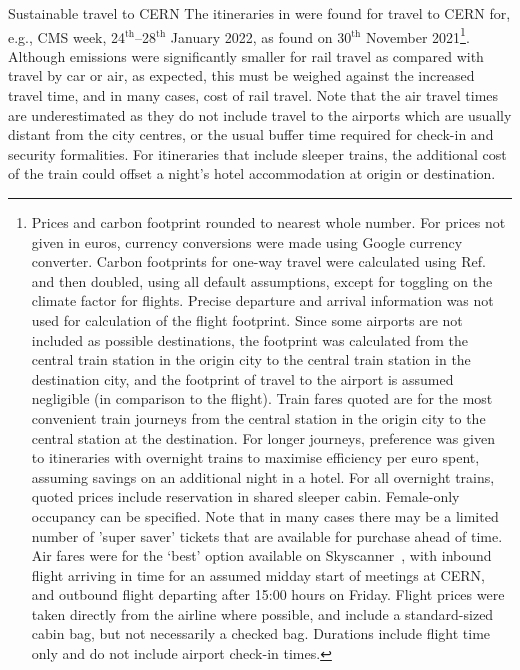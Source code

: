 \documentclass[../SustainableHEP.tex]{subfiles}
\begin{document}
\begin{casestudy}{Sustainable travel to CERN}%
The itineraries in  were found for travel to CERN for, e.g., CMS week, 24$^\text{th}$--28$^\text{th}$ January 2022, as found on 30$^\text{th}$ November 2021\footnote{Prices and carbon footprint rounded to nearest whole number.  For prices not given in euros, currency conversions were made using Google currency converter.  Carbon footprints for one-way travel were calculated using Ref.~\cite{ecopassenger} and then doubled, using all default assumptions, except for toggling on the climate factor for flights.  Precise departure and arrival information was not used for calculation of the flight footprint.  Since some airports are not included as possible destinations, the footprint was calculated from the central train station in the origin city to the central train station in the destination city, and the footprint of travel to the airport is assumed negligible (in comparison to the flight).  Train fares quoted are for the most convenient train journeys from the central station in the origin city to the central station at the destination.  For longer journeys, preference was given to itineraries with overnight trains to maximise efficiency per euro spent, assuming savings on an additional night in a hotel.  For all overnight trains, quoted prices include reservation in shared sleeper cabin. Female-only occupancy can be specified. Note that in many cases there may be a limited number of 'super saver' tickets that are available for purchase ahead of time.  Air fares were for the ‘best’ option available on Skyscanner~\cite{skyscanner}, with inbound flight arriving in time for an assumed midday start of meetings at CERN, and outbound flight departing after 15:00 hours on Friday.  Flight prices were taken directly from the airline where possible, and include a standard-sized cabin bag, but not necessarily a checked bag.  Durations include flight time only and do not include airport check-in times.}.  Although emissions were significantly smaller for rail travel as compared with travel by car or air, as expected, this must be weighed against the increased travel time, and in many cases, cost of rail travel.  Note that the air travel times are underestimated as they do not include travel to the airports which are usually distant from the city centres, or the usual buffer time required for check-in and security formalities.  For itineraries that include sleeper trains, the additional cost of the train could offset a night's hotel accommodation at origin or destination.
\end{casestudy}
\end{document}
